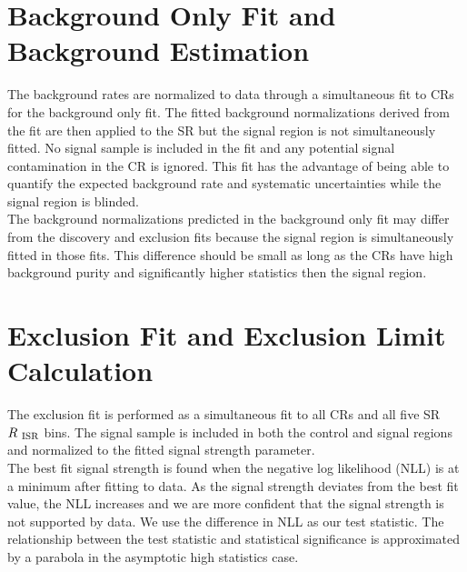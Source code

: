 \section{Background Only Fit and Background Estimation}
\label{sec:stat:bkgonly}

\indent The background rates are normalized to data through a simultaneous fit to CRs for the background only fit.  The fitted background normalizations derived from the fit are then applied to the SR but the signal region is not simultaneously fitted.  No signal sample is included in the fit and any potential signal contamination in the CR is ignored.  This fit has the advantage of being able to quantify the expected background rate and systematic uncertainties while the signal region is blinded. \\


\indent The background normalizations predicted in the background only fit may differ from the discovery and exclusion fits because the signal region is simultaneously fitted in those fits. This difference should be small as long as the CRs have high background purity and significantly higher statistics then the signal region.  \\

\section{Exclusion Fit and Exclusion Limit Calculation}
\label{sec:stat:limit}

\indent The exclusion fit is performed as a simultaneous fit to all CRs and all five SR $R_{~\mathrm{ISR}}$ bins. The signal sample is included in both the control and signal regions and normalized to the fitted signal strength parameter.   \\

\indent The best fit signal strength is found when the negative log likelihood (NLL) is at a minimum after fitting to data.  As the signal strength deviates from the best fit value, the NLL increases and we are more confident that the signal strength is not supported by data.  We use the difference in NLL as our test statistic.  The relationship between the test statistic and statistical significance is approximated by a parabola in the asymptotic high statistics case. \\

